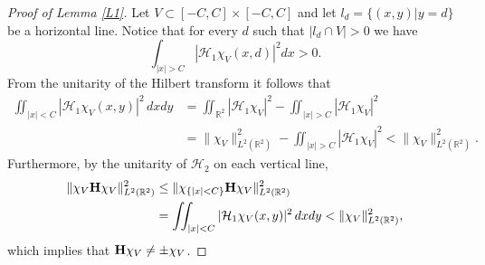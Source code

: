\documentclass[10pt,a4paper]{amsart}
\def\H{{\bf H}}
\def\HH{{\mathcal H}}
\def\R{{\mathbb R}}
\begin{document}
	\begin{proof}[Proof of Lemma \ref{L1}]
		Let $V\subset [-C,C]\times [-C,C]$ and let $l_d=\{(x,y)|y=d\}$ be a horizontal line.
		Notice that for every $d$ such that $|l_d\cap V|>0$ we have
		$$\int_{|x|>C}|\mathcal{H}_1\chi_V(x,d)|^2dx>0.$$
		From the unitarity of the Hilbert transform it follows that
		\begin{align*}
		\iint_{|x|<C}|\mathcal{H}_1\chi_V(x,y)|^2\,dxdy&=\iint_{\R^2}|\mathcal{H}_1\chi_V|^2-
		\iint_{|x|>C}|\mathcal{H}_1\chi_V|^2\\
		&=\|\chi_V\|^2_{L^2(\R^2)}-\iint_{|x|>C}|\mathcal{H}_1\chi_V|^2<\|\chi_V\|^2_{L^2(\R^2)}.
		\end{align*}
		Furthermore, by the unitarity of $\HH_2$ on each vertical line,
		\begin{align*}
		\|\chi_V \H\chi_V\|^2_{L^2(\R^2)}&\leq \|\chi_{\{|x|<C\}} \H\chi_V\|^2_{L^2(\R^2)}\\
		&=\iint_{|x|<C}|\mathcal{H}_1\chi_V(x,y)|^2\,dxdy<\|\chi_V\|^2_{L^2(\R^2)},
		\end{align*}
		which implies that $\H\chi_V\neq \pm \chi_V$.
	\end{proof}
\end{document}
